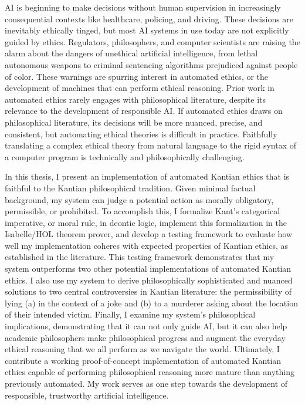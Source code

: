 %
\begin{isabellebody}%
%
%
\isadelimtheory
%
\endisadelimtheory
%
\isatagtheory
%
\endisatagtheory
{\isafoldtheory}%
%
\isadelimtheory
%
\endisadelimtheory
%
\begin{isamarkuptext}%
AI is beginning to make decisions without human supervision in increasingly consequential 
contexts like healthcare, policing, and driving. These decisions are inevitably ethically tinged, 
but most AI systems in use today are not explicitly guided by ethics.
Regulators, philosophers, and computer scientists are raising the alarm about the 
dangers of unethical artificial intelligence, from lethal autonomous weapons to criminal
sentencing algorithms prejudiced against people of color. These warnings are spurring interest in 
automated ethics, or the development of machines that can perform ethical reasoning. Prior work in 
automated ethics rarely engages with philosophical literature, despite its relevance to the 
development of responsible AI. If automated ethics draws on philosophical
literature, its decisions will be more nuanced, precise, and consistent, but automating ethical theories is 
difficult in practice. Faithfully translating a complex ethical theory from natural language to the 
rigid syntax of a computer program is technically and philosophically challenging.

In this thesis, I present an implementation of automated Kantian
ethics that is faithful to the Kantian philosophical tradition. Given minimal factual background, my 
system can judge a potential action as morally obligatory, permissible, or prohibited.
To accomplish this, I formalize Kant's categorical imperative, or moral rule,
in deontic logic, implement this formalization 
in the Isabelle/HOL theorem prover, and develop a testing framework to evaluate how well 
my implementation coheres with expected properties of Kantian ethics, as established in the literature. 
This testing framework demonstrates that my system outperforms two other potential implementations of 
automated Kantian ethics. I also use my system to derive philosophically sophisticated and nuanced 
solutions to two central controversies in Kantian literature: the permissibility of lying (a) in the 
context of a joke and (b) to a murderer asking about the location of their intended victim. Finally, I 
examine my system's philosophical implications, demonstrating that it can not only guide AI, but it can
also help academic philosophers make philosophical progress and augment the everyday ethical reasoning
that we all perform as we navigate the world. Ultimately, I contribute a working proof-of-concept implementation
of automated Kantian ethics capable of performing philosophical reasoning more mature than anything previously
automated. My work serves as one step towards the development of responsible, trustworthy artificial intelligence.%
\end{isamarkuptext}\isamarkuptrue%
%
\isadelimtheory
%
\endisadelimtheory
%
\isatagtheory
%
\endisatagtheory
{\isafoldtheory}%
%
\isadelimtheory
%
\endisadelimtheory
%
\end{isabellebody}%
